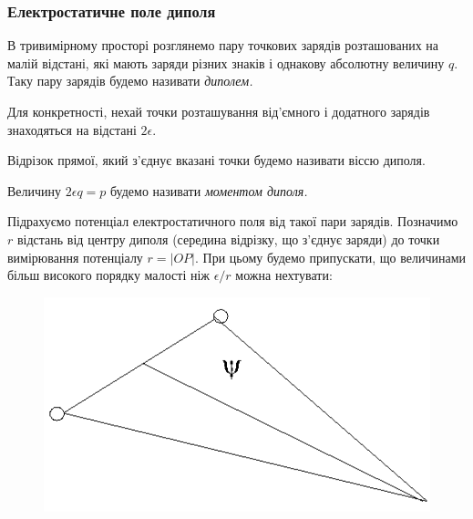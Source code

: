 % 


% 

% 



\subsubsection{Електростатичне поле диполя}

\begin{definition}[диполя]
	В тривимірному просторі розглянемо пару точкових зарядів розташованих на малій відстані, які мають заряди різних знаків і однакову абсолютну величину $q$. Таку пару зарядів будемо називати \it{диполем}.
\end{definition}

Для конкретності, нехай точки розташування від'ємного і додатного зарядів знаходяться на відстані $2 \epsilon$. 

\begin{definition}
	Відрізок прямої, який з'єднує вказані точки будемо називати віссю диполя.
\end{definition}

\begin{definition}
	Величину $2 \epsilon q = p$ будемо називати \it{моментом диполя}.
\end{definition}

Підрахуємо потенціал електростатичного поля від такої пари зарядів. Позначимо $r$ відстань від центру диполя (середина відрізку, що з'єднує заряди) до точки вимірювання потенціалу $r = |OP|$. При цьому будемо припускати, що величинами більш високого порядку малості ніж $\epsilon/r$ можна нехтувати:
\begin{figure}[H]
	\centering
	\includegraphics[width=.5\textwidth]{img/13-1.png}
\end{figure}
 
